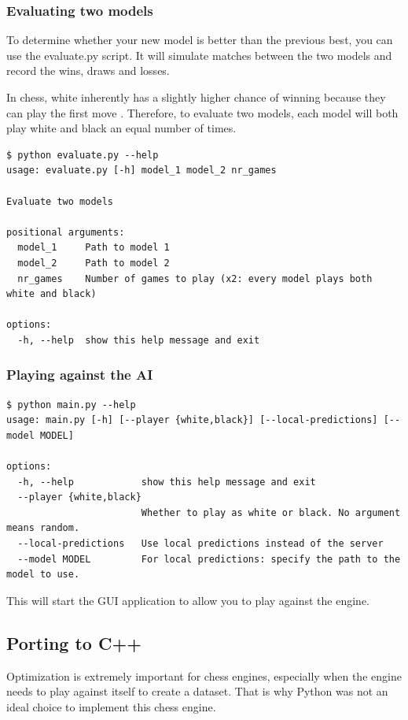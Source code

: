 \documentclass{article}
\begin{document}
\subsubsection{Evaluating two models}

To determine whether your new model is better than the previous best, you can use the evaluate.py script.
It will simulate matches between the two models and record the wins, draws and losses.

In chess, white inherently has a slightly higher chance of winning because they can play the first move \cite{FirstmoveAdvantageChess2022}.
Therefore, to evaluate two models, each model will both play white and black an equal number of times.

\begin{verbatim}
$ python evaluate.py --help
usage: evaluate.py [-h] model_1 model_2 nr_games

Evaluate two models

positional arguments:
  model_1     Path to model 1
  model_2     Path to model 2
  nr_games    Number of games to play (x2: every model plays both white and black)

options:
  -h, --help  show this help message and exit
\end{verbatim}

\subsubsection{Playing against the AI}

\begin{verbatim}
$ python main.py --help
usage: main.py [-h] [--player {white,black}] [--local-predictions] [--model MODEL]

options:
  -h, --help            show this help message and exit
  --player {white,black}
                        Whether to play as white or black. No argument means random.
  --local-predictions   Use local predictions instead of the server
  --model MODEL         For local predictions: specify the path to the model to use.
\end{verbatim}

This will start the GUI application to allow you to play against the engine. 

\subsection{Porting to C++}

Optimization is extremely important for chess engines, especially when the engine needs to play
against itself to create a dataset. That is why Python was not an ideal choice to implement this chess engine.
\end{document}
